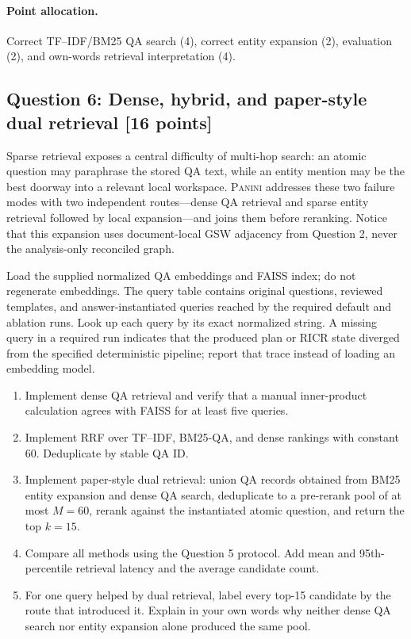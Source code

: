 \documentclass[11pt]{article}
\newcommand{\PANINI}{{\mdseries\textsc{Panini}}\xspace}
\newcommand{\question}[3]{%
  \subsection[Question #1: #2 (#3 points)]{Question #1: #2 \hfill [#3 points]}%
}
\newcommand{\grading}{\paragraph{Point allocation.}}
\begin{document}
\grading Correct TF--IDF/BM25 QA search (4), correct entity expansion (2),
evaluation (2), and own-words retrieval interpretation (4).

\question{6}{Dense, hybrid, and paper-style dual retrieval}{16}

Sparse retrieval exposes a central difficulty of multi-hop search: an atomic
question may paraphrase the stored QA text, while an entity mention may be the
best doorway into a relevant local workspace. \PANINI addresses these two
failure modes with two independent routes---dense QA retrieval and sparse
entity retrieval followed by local expansion---and joins them before
reranking. Notice that this expansion uses document-local GSW adjacency from
Question 2, never the analysis-only reconciled graph.

Load the supplied normalized QA embeddings and FAISS index; do not regenerate
embeddings. The query table contains original questions, reviewed templates,
and answer-instantiated queries reached by the required default and ablation
runs. Look up each query by its exact normalized string. A missing query in a
required run indicates that the produced plan or RICR state diverged from the
specified deterministic pipeline; report that trace instead of loading an
embedding model.

\begin{enumerate}[label=(\alph*)]
  \item Implement dense QA retrieval and verify that a manual inner-product
        calculation agrees with FAISS for at least five queries.
  \item Implement RRF over TF--IDF, BM25-QA, and dense rankings with constant
        60. Deduplicate by stable QA ID.
  \item Implement paper-style dual retrieval: union QA records obtained from
        BM25 entity expansion and dense QA search, deduplicate to a pre-rerank
        pool of at most $M=60$, rerank against the instantiated atomic question,
        and return the top $k=15$.
  \item Compare all methods using the Question 5 protocol. Add mean and
        95th-percentile retrieval latency and the average candidate count.
  \item For one query helped by dual retrieval, label every top-15 candidate
        by the route that introduced it. Explain in your own words why neither
        dense QA search nor entity expansion alone produced the same pool.
\end{enumerate}
\end{document}
